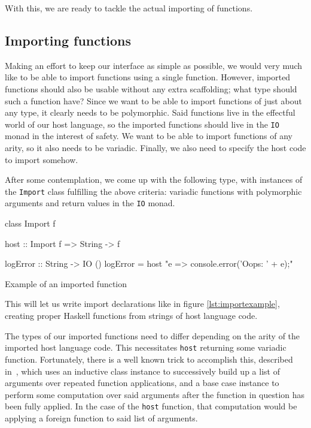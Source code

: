 \documentclass{sigplanconf}
\begin{document}
With this, we are ready to tackle the actual importing of functions.

\subsection{Importing functions}\label{sec:import}

Making an effort to keep our interface as simple as possible, we would very
much like to be able to import functions using a single function.
However, imported functions should also be usable without any extra
scaffolding; what type should such a function have?
Since we want to be able to import functions of just about any type, it clearly
needs to be polymorphic. Said functions live in the effectful world of our
host language, so the imported functions should live in the \lstinline!IO!
monad in the interest of safety. We want to be able to import functions of any
arity, so it also needs to be variadic. Finally, we also need to specify the
host code to import somehow.

After some contemplation, we come up with the following type, with instances of
the \lstinline!Import! class fulfilling the above criteria: variadic functions
with polymorphic arguments and return values in the \lstinline!IO! monad.

\begin{code}
  class Import f

  host :: Import f => String -> f
\end{code}

\begin{listingfloat}
\begin{code}
  logError :: String -> IO ()
  logError = host "e => {console.error('Oops: ' + e);}"
\end{code}
\caption{Example of an imported function}
\label{lst:importexample}
\end{listingfloat}

This will let us write import declarations like in figure
\ref{lst:importexample}, creating proper Haskell functions from strings of
host language code.

The types of our imported functions need to differ depending on the arity of
the imported host language code. This necessitates \lstinline!host! returning
some variadic function. Fortunately, there is a well known trick to accomplish
this, described in\ \cite{printf}, which uses an inductive class instance to
successively build up a list of arguments over repeated function applications,
and a base case instance to perform some computation over said arguments after
the function in question has been fully applied.
In the case of the \lstinline!host! function, that computation would be
applying a foreign function to said list of arguments.
\end{document}
